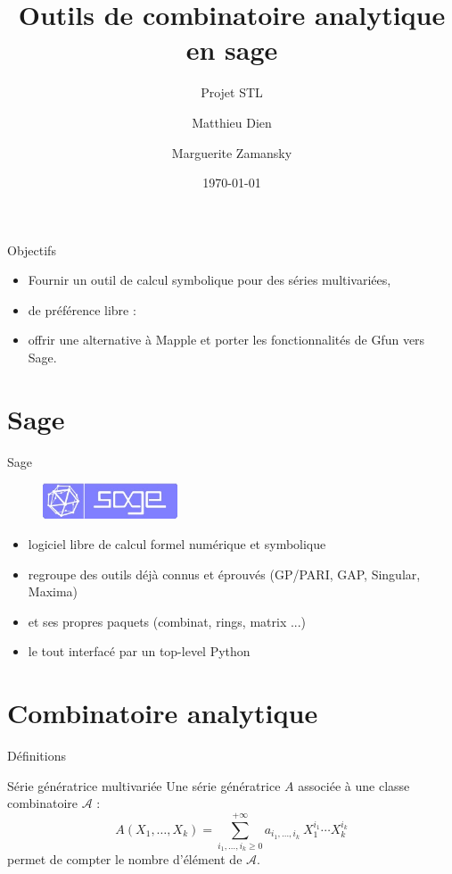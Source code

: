 \documentclass{beamer}
\title	
{Outils de combinatoire analytique en sage}
\subtitle{Projet STL}
\author
{Matthieu Dien \and Marguerite Zamansky}
\institute
{Université Pierre et Marie Curie}
\date{\today}
\begin{document}
\begin{frame}
\titlepage
\end{frame}

\begin{frame}{Objectifs}
\begin{itemize}
\item Fournir un outil de calcul symbolique pour des séries multivariées,
\item de préférence libre :
\item offrir une alternative à Mapple et porter les fonctionnalités de Gfun vers Sage.
\end{itemize}
\end{frame}

\section{Sage}
\begin{frame}{Sage}

\begin{figure}
\includegraphics[width=4cm]{sage_logo_new.jpeg}
\end{figure}

\begin{itemize}
\item logiciel libre de calcul formel num\'erique et symbolique
\item regroupe des outils déjà connus et éprouvés (GP/PARI, GAP, Singular, Maxima)
\item et ses propres paquets (combinat, rings, matrix ...)
\item le tout interfacé par un top-level Python
\end{itemize}

\end{frame}
\section{Combinatoire analytique}

\begin{frame}{Définitions}
\begin{block}{Série génératrice multivariée}
Une série génératrice $A$ associée à une classe combinatoire $\mathcal{A}$ :%
$$ A(X_1, \ldots, X_k) = \sum_{i_1, \ldots ,i_k \ge 0}^{+\infty} a_{i_1, \ldots , i_k} \ X_1^{i_1} \cdots X_k^{i_k} $$
permet de compter le nombre d'élément de $\mathcal{A}$. %
\end{block}

\end{frame}
\end{document}
